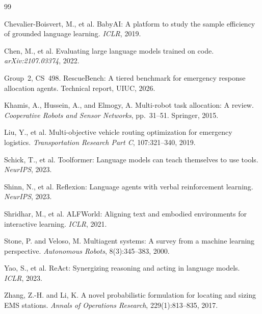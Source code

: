 \documentclass{article}
\begin{document}
\begin{thebibliography}{99}
\small

Chevalier-Boisvert, M., et al.
BabyAI: A platform to study the sample efficiency of grounded language learning.
\textit{ICLR}, 2019.

Chen, M., et al.
Evaluating large language models trained on code.
\textit{arXiv:2107.03374}, 2022.

Group~2, CS~498.
RescueBench: A tiered benchmark for emergency response allocation agents.
Technical report, UIUC, 2026.

Khamis, A., Hussein, A., and Elmogy, A.
Multi-robot task allocation: A review.
\textit{Cooperative Robots and Sensor Networks}, pp.\ 31--51. Springer, 2015.

Liu, Y., et al.
Multi-objective vehicle routing optimization for emergency logistics.
\textit{Transportation Research Part C}, 107:321--340, 2019.

Schick, T., et al.
Toolformer: Language models can teach themselves to use tools.
\textit{NeurIPS}, 2023.

Shinn, N., et al.
Reflexion: Language agents with verbal reinforcement learning.
\textit{NeurIPS}, 2023.

Shridhar, M., et al.
ALFWorld: Aligning text and embodied environments for interactive learning.
\textit{ICLR}, 2021.

Stone, P. and Veloso, M.
Multiagent systems: A survey from a machine learning perspective.
\textit{Autonomous Robots}, 8(3):345--383, 2000.

Yao, S., et al.
ReAct: Synergizing reasoning and acting in language models.
\textit{ICLR}, 2023.

Zhang, Z.-H. and Li, K.
A novel probabilistic formulation for locating and sizing EMS stations.
\textit{Annals of Operations Research}, 229(1):813--835, 2017.

\end{thebibliography}
\end{document}
